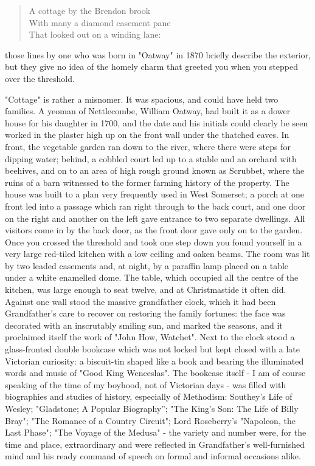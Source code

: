 \begin{quote}
A cottage by the Brendon brook \\
With many a diamond casement pane \\
That looked out on a winding lane:
\end{quote}

those lines by one who was born in "Oatway" in 1870 briefly describe the exterior, but they give no idea of the homely charm that greeted you when you stepped over the threshold.

"Cottage" is rather a misnomer. It was spacious, and could have held two families. A yeoman of Nettlecombe, William Oatway, had built it as a dower house for his daughter in 1700, and the date and his initials could clearly be seen worked in the plaster high up on the front wall under the thatched eaves. In front, the vegetable garden ran down to the river, where there were steps for dipping water; behind, a cobbled court led up to a stable and an orchard with beehives, and on to an area of high rough ground known as Scrubbet, where the ruins of a barn witnessed to the former farming  history of the property. The house was built to a plan very frequently used in West Somerset; a porch at one front led into a passage which ran right through to the back court, and one door on the right and another on the left gave entrance to two separate dwellings. All visitors come in by the back door, as the front door gave only on to the garden. Once you crossed the threshold and took one step down you found yourself in a very large red-tiled kitchen with a low ceiling and oaken beams. The room was lit by two leaded casements and, at night, by a paraffin lamp placed on a table under a white enamelled dome. The table, which occupied all the centre of the kitchen, was large enough to seat twelve, and at Christmastide it often did. Against one wall stood the massive grandfather clock, which it had been Grandfather’s care to recover on restoring the family fortunes: the face was decorated with an inscrutably smiling sun, and marked the seasons, and it proclaimed itself the work of "John How, Watchet". Next to the clock stood a glass-fronted double bookcase which was not locked but kept closed with a late Victorian curiosity: a biscuit-tin shaped like a book and bearing the illuminated words and music of "Good King Wenceslas". The bookcase itself - I am of course speaking of the time of my boyhood, not of Victorian days - was filled with biographies and studies of history, especially of Methodism: Southey’s Life of Wesley; "Gladstone; A Popular Biography”; "The King's Son: The Life of Billy Bray"; "The Romance of a Country Circuit"; Lord Roseberry's "Napoleon, the Last Phase"; "The Voyage of the Medusa" - the variety and number were, for the time and place, extraordinary and were reflected in Grandfather's well-furnished mind and his ready command of speech on formal and informal occasions alike.


